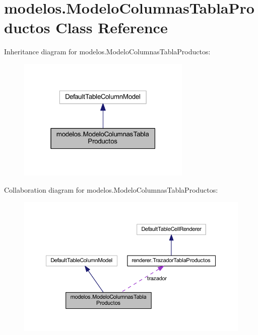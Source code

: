\hypertarget{classmodelos_1_1_modelo_columnas_tabla_productos}{}\section{modelos.\+Modelo\+Columnas\+Tabla\+Productos Class Reference}
\label{classmodelos_1_1_modelo_columnas_tabla_productos}


Inheritance diagram for modelos.\+Modelo\+Columnas\+Tabla\+Productos\+:
\nopagebreak
\begin{figure}[H]
\begin{center}
\leavevmode
\includegraphics[width=235pt]{classmodelos_1_1_modelo_columnas_tabla_productos__inherit__graph}
\end{center}
\end{figure}


Collaboration diagram for modelos.\+Modelo\+Columnas\+Tabla\+Productos\+:
\nopagebreak
\begin{figure}[H]
\begin{center}
\leavevmode
\includegraphics[width=350pt]{classmodelos_1_1_modelo_columnas_tabla_productos__coll__graph}
\end{center}
\end{figure}
